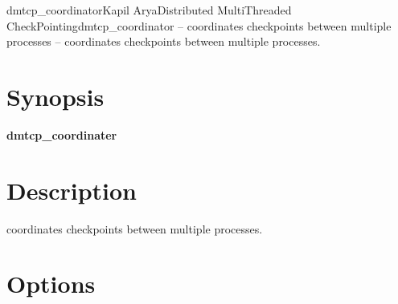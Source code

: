 

\begin{Name}{1}{dmtcp\_coordinator}{Kapil Arya}{Distributed MultiThreaded CheckPointing}{dmtcp\_coordinator -- coordinates checkpoints between multiple processes}
   -- coordinates checkpoints between multiple processes.
\end{Name}

\section{Synopsis}
\textbf{dmtcp_coordinater} 

\section{Description}

 coordinates checkpoints between multiple processes.

\section{Options}

